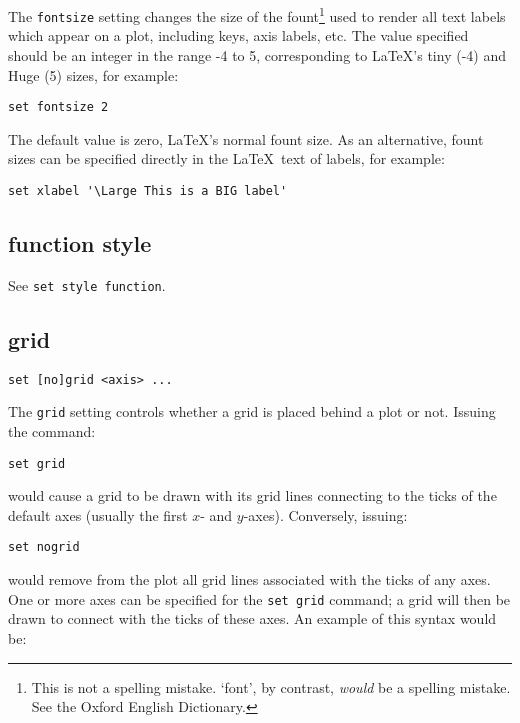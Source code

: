 The {\tt fontsize} setting changes the size of the fount\footnote{This is not a
spelling mistake. `font', by contrast, \textit{would} be a spelling mistake. See the
Oxford English Dictionary.} used to render all text labels which appear on a
plot, including keys, axis labels, etc. The value specified should be an integer
in the range -4 to 5, corresponding to \LaTeX's tiny (-4) and Huge (5) sizes,
for example:

\begin{verbatim}
set fontsize 2
\end{verbatim}

The default value is zero, \LaTeX's normal fount size. As an alternative, fount
sizes can be specified directly in the \LaTeX\ text of labels, for example:

\begin{verbatim}
set xlabel '\Large This is a BIG label'
\end{verbatim}

\subsection{function style}

See {\tt set style function}.

\subsection{grid}

\begin{verbatim}
set [no]grid <axis> ...
\end{verbatim}

The {\tt grid} setting controls whether a grid is placed behind a plot or not.
Issuing the command:

\begin{verbatim}
set grid
\end{verbatim}

\noindent would cause a grid to be drawn with its grid lines connecting to the ticks of
the default axes (usually the first $x$- and $y$-axes).  Conversely, issuing:

\begin{verbatim}
set nogrid
\end{verbatim}

\noindent would remove from the plot all grid lines associated with the ticks of any axes.
One or more axes can be specified for the {\tt set grid} command; a grid will
then be drawn to connect with the ticks of these axes. An example of this syntax
would be:

